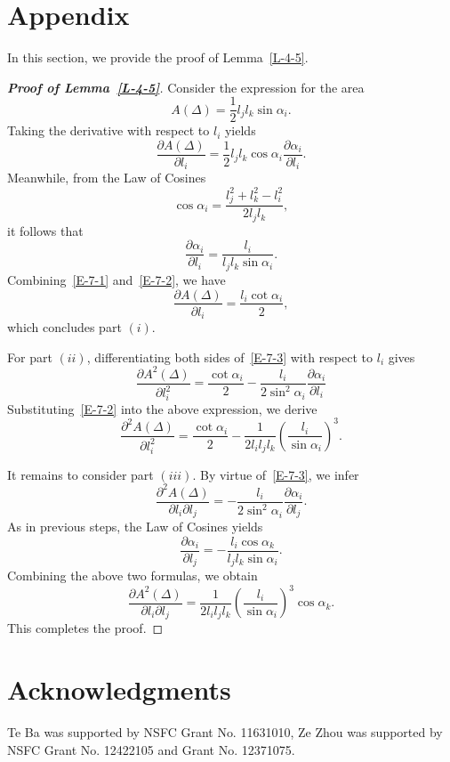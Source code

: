 \documentclass[11pt,letterpaper]{amsart}
\theoremstyle{plain}
\theoremstyle{definition}
\theoremstyle{remark}
\numberwithin{equation}{section}
\begin{document}
\section{Appendix}\label{S-7}

In this section, we provide the proof of Lemma~\ref{L-4-5}.

\begin{proof}[\textbf{Proof of Lemma~\ref{L-4-5}}]
Consider the expression for the area
\[
A(\Delta)=\frac{1}{2}l_jl_k\sin \alpha_i.
\]
Taking the derivative with respect to $l_i$ yields
\begin{equation}\label{E-7-1}
\frac{\partial A(\Delta)}{\partial l_i}=\frac{1}{2}l_jl_k\cos \alpha_i\frac{\partial \alpha_i}{\partial l_i}.
\end{equation}
Meanwhile, from the Law of Cosines
\[
\cos \alpha_i=\frac{l_j^2+l_k^2-l_i^2}{2l_jl_k},
\]
it follows that
\begin{equation}\label{E-7-2}
\frac{\partial \alpha_i}{\partial l_i}=\frac{l_i}{l_jl_k\sin \alpha_i}.
\end{equation}
Combining~\eqref{E-7-1} and~\eqref{E-7-2}, we have
\begin{equation}\label{E-7-3}
\frac{\partial A(\Delta)}{\partial l_i}=\frac{l_i\cot\alpha_i}{2},
\end{equation}
which concludes part $(i)$.

For part $(ii)$, differentiating both sides of~\eqref{E-7-3} with respect to $l_i$ gives
\[
\frac{\partial A^2(\Delta)}{\partial l_i^2}=\frac{\cot\alpha_i}{2}-\frac{l_i}{2\sin^2 \alpha_i}\frac{\partial \alpha_i}{\partial l_i}
\]
Substituting~\eqref{E-7-2} into the above expression, we derive
\[
\frac{\partial^2 A(\Delta)}{\partial l_i^2}=\frac{\cot\alpha_i}{2}
    -\frac{1}{2l_il_jl_k}\left(\frac{l_i}{\sin\alpha_i}\right)^3.
\]

It remains to consider part $(iii)$. By virtue of~\eqref{E-7-3}, we infer
\[
\frac{\partial^2 A(\Delta)}{\partial l_i\partial l_j}=-\frac{l_i}{2\sin^2 \alpha_i}\frac{\partial \alpha_i}{\partial l_j}.
\]
As in previous steps, the Law of Cosines yields
\[
\frac{\partial \alpha_i}{\partial l_j}=-\frac{l_i\cos\alpha_k}{l_jl_k\sin \alpha_i}.
\]
Combining the above two formulas, we obtain
\[
\frac{\partial A^2(\Delta)}{\partial l_i\partial l_j}=\frac{1}{2l_il_jl_k}\left(\frac{l_i}{\sin \alpha_i}\right)^3\cos\alpha_k.
\]
This completes the proof.
\end{proof}

\section*{Acknowledgments}
Te Ba was supported by NSFC Grant No. 11631010, Ze Zhou was supported by NSFC Grant No. 12422105 and Grant No. 12371075.
\end{document}
